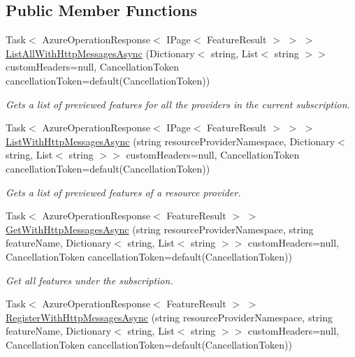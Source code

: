 \subsection*{Public Member Functions}
\begin{DoxyCompactItemize}
\item 
Task$<$ Azure\+Operation\+Response$<$ I\+Page$<$ Feature\+Result $>$ $>$ $>$ \hyperlink{interface_microsoft_1_1_azure_1_1_management_1_1_resources_1_1_i_features_operations_a163a1fcd16988193898bcc3131ac0ee0}{List\+All\+With\+Http\+Messages\+Async} (Dictionary$<$ string, List$<$ string $>$$>$ custom\+Headers=null, Cancellation\+Token cancellation\+Token=default(Cancellation\+Token))
\begin{DoxyCompactList}\small\item\em Gets a list of previewed features for all the providers in the current subscription. \end{DoxyCompactList}\item 
Task$<$ Azure\+Operation\+Response$<$ I\+Page$<$ Feature\+Result $>$ $>$ $>$ \hyperlink{interface_microsoft_1_1_azure_1_1_management_1_1_resources_1_1_i_features_operations_a5fb7a48877eaa1481a45dbc03238ce7c}{List\+With\+Http\+Messages\+Async} (string resource\+Provider\+Namespace, Dictionary$<$ string, List$<$ string $>$$>$ custom\+Headers=null, Cancellation\+Token cancellation\+Token=default(Cancellation\+Token))
\begin{DoxyCompactList}\small\item\em Gets a list of previewed features of a resource provider. \end{DoxyCompactList}\item 
Task$<$ Azure\+Operation\+Response$<$ Feature\+Result $>$ $>$ \hyperlink{interface_microsoft_1_1_azure_1_1_management_1_1_resources_1_1_i_features_operations_a46c7219d2e7638da350f40371a79a8ca}{Get\+With\+Http\+Messages\+Async} (string resource\+Provider\+Namespace, string feature\+Name, Dictionary$<$ string, List$<$ string $>$$>$ custom\+Headers=null, Cancellation\+Token cancellation\+Token=default(Cancellation\+Token))
\begin{DoxyCompactList}\small\item\em Get all features under the subscription. \end{DoxyCompactList}\item 
Task$<$ Azure\+Operation\+Response$<$ Feature\+Result $>$ $>$ \hyperlink{interface_microsoft_1_1_azure_1_1_management_1_1_resources_1_1_i_features_operations_ae4e6eaf03a6f94b0821f80d9d9a99eaf}{Register\+With\+Http\+Messages\+Async} (string resource\+Provider\+Namespace, string feature\+Name, Dictionary$<$ string, List$<$ string $>$$>$ custom\+Headers=null, Cancellation\+Token cancellation\+Token=default(Cancellation\+Token))

\end{DoxyCompactItemize}
